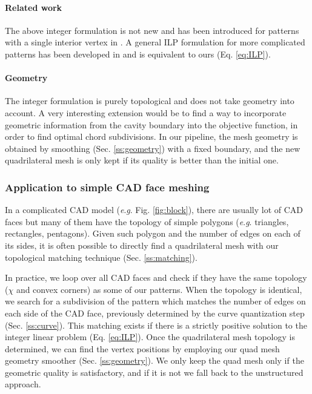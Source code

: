 \documentclass[AMA,STIX1COL]{WileyNJD-v2}
\newcommand{\eg}{\textit{e}.\textit{g}. }
\newcommand\rsec[1]{Sec. \ref{#1}}
\newcommand\reqt[1]{Eq. \ref{#1}}
\newcommand\rfig[1]{Fig. \ref{#1}}
\begin{document}
{\paragraph{Related work} 
The above integer formulation is not new and has been
introduced for patterns with a single interior vertex in \cite{bunin2008}.
A general ILP formulation for more complicated patterns has been developed in \cite{takayama2014}
and is equivalent to ours (\reqt{eq:ILP}).

\paragraph{Geometry} 
The integer formulation is purely topological and does
not take geometry into account. A very interesting extension would be to
find a way to incorporate geometric information from the cavity boundary into the 
objective function, in order to find optimal chord subdivisions.
In our pipeline, the mesh geometry is obtained by smoothing (\rsec{ss:geometry})
with a fixed boundary, and the new quadrilateral mesh is only kept if its quality
is better than the initial one.

\subsubsection{Application to simple CAD face meshing}
\label{sss:simple_face}

In a complicated CAD model (\eg \rfig{fig:block}), there are usually lot of CAD
faces but many of them have the topology of simple polygons (\eg triangles,
rectangles, pentagons). Given such polygon and the number of edges on each of
its sides, it is often possible to directly find a quadrilateral mesh with our
topological matching technique (\rsec{ss:matching}). 

In practice, we loop over all CAD faces and check if they have the same
topology ($\chi$ and convex corners) as some of our patterns. When the topology
is identical, we search for a subdivision of the pattern which matches the
number of edges on each side of the CAD face, previously determined by the
curve quantization step (\rsec{ss:curve}). This matching exists if there is a
strictly positive solution to the integer linear problem (\reqt{eq:ILP}).
Once the quadrilateral mesh topology is determined, we can find the vertex
positions by employing our quad mesh geometry smoother (\rsec{ss:geometry}).
We only keep the quad mesh only if the geometric quality is satisfactory, and
if it is not we fall back to the unstructured approach.

}
\end{document}
